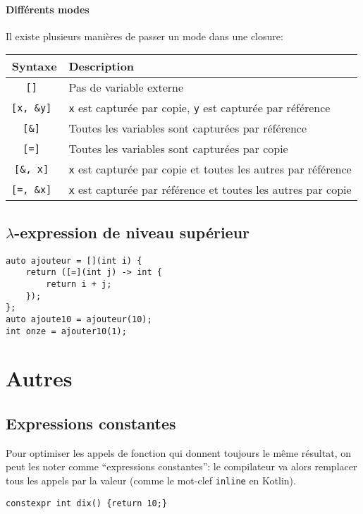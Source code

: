 \documentclass[10pt,a4paper,french]{article}
\begin{document}
\paragraph{Différents modes} Il existe plusieurs manières de passer un mode dans une closure:

\begin{tabular}{c|l}
Syntaxe & Description \\
\hline
\tt [] & Pas de variable externe \\
\tt [x, \&y] & {\tt x} est capturée par copie, {\tt y} est capturée par référence \\
\tt [\&] & Toutes les variables sont capturées par référence \\
\tt [=] & Toutes les variables sont capturées par copie \\
\tt [\&, x] & {\tt x} est capturée par copie et toutes les autres par référence \\
\tt [=, \&x] & {\tt x} est capturée par référence et toutes les autres par copie \\
\end{tabular}

\subsection{$\lambda$-expression de niveau supérieur}

\begin{verbatim}
auto ajouteur = [](int i) {
    return ([=](int j) -> int {
        return i + j;
    });
};
auto ajoute10 = ajouteur(10);
int onze = ajouter10(1);
\end{verbatim}

\section{Autres}

\subsection{Expressions constantes}

Pour optimiser les appels de fonction qui donnent toujours le même résultat, on peut les noter comme ``expressions constantes'': le compilateur va alors remplacer tous les appels par la valeur (comme le mot-clef \texttt{inline} en Kotlin).

\begin{verbatim}
constexpr int dix() {return 10;}
\end{verbatim}
\end{document}
